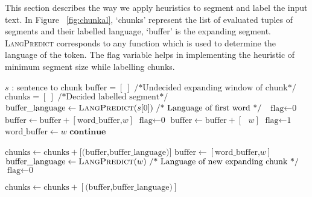 \documentclass[11pt]{article}
\begin{document}
This section describes the way we apply heuristics to segment and label the input text.
In Figure ~\ref{fig:chunkal}, `chunks' represent the list of evaluated tuples of segments and their labelled language, `buffer' is the expanding segment.
 \textsc{LangPredict} corresponds to any function which is used to determine the language of the token. The flag 
variable helps in implementing the heuristic of minimum segment size while labelling chunks.
\begin{algorithm}
\caption*{\textsc{}}
{\fontsize{9}{9}\selectfont
\begin{algorithmic}[1]
\Require \(s\) : sentence to chunk
\State $\textrm{buffer} = [\ ] \text{ /*Undecided expanding window of chunk*/}$
\State $\textrm{chunks} = [\ ] \text{ /*Decided labelled segment*/ }$
\State $\textrm{buffer\_language} \gets \textsc{LangPredict}(s[0]) \text{ /* Language of first word */ }$
\State $\textrm{flag} \gets \text{0}$
        \State $\textrm{buffer} \gets \textrm{buffer} + [\textrm{word\_buffer,\(w\)}] $
        \State $\textrm{flag} \gets \text{0}$
        \Else
        \State $\textrm{buffer} \gets \textrm{buffer} +[\textrm{ \(w\)}] $
        \EndIf
        \EndIf
{}
        \State $\textrm{flag} \gets \text{1}$
        \State $\textrm{word\_buffer} \gets \textrm{\(w\)} $
        \State $\textbf{continue}$

        \Else
        \State $\textrm{chunks} \gets \textrm{chunks} + \textrm{[(buffer,buffer\_language)]} $
        \State $\textrm{buffer} \gets [\textrm{word\_buffer,\(w\)}] $
        \State $\textrm{buffer\_language} \gets \textsc{LangPredict}\text{(\(w\))} \text{ /* Language of new expanding chunk */}$
        \State $\textrm{flag} \gets \text{0}$
        \EndIf

\EndIf
\EndFor
{}
        \State $\textrm{chunks} \gets \textrm{chunks} +[\textrm{(buffer,buffer\_language)}] $

\EndIf
\end{algorithmic}}
\end{algorithm}
\end{document}
